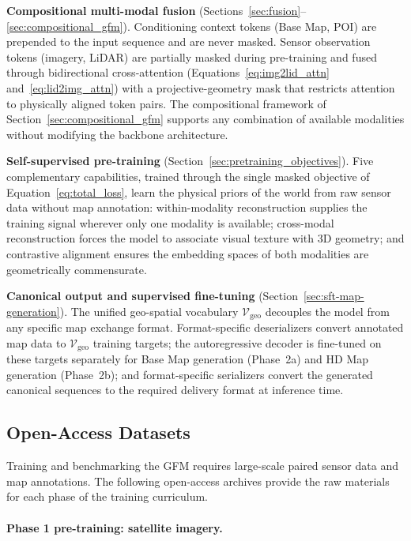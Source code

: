 \documentclass{book}
\begin{document}
\textbf{Compositional multi-modal fusion}
(Sections~\ref{sec:fusion}--\ref{sec:compositional_gfm}).
Conditioning context tokens (Base Map, POI) are prepended
to the input sequence and are never masked.  Sensor
observation tokens (imagery, LiDAR) are partially masked
during pre-training and fused through bidirectional
cross-attention (Equations~\ref{eq:img2lid_attn}
and~\ref{eq:lid2img_attn}) with a projective-geometry mask
that restricts attention to physically aligned token pairs.
The compositional framework of
Section~\ref{sec:compositional_gfm} supports any combination
of available modalities without modifying the backbone
architecture.

\textbf{Self-supervised pre-training}
(Section~\ref{sec:pretraining_objectives}).
Five complementary capabilities, trained through the single
masked objective of Equation~\ref{eq:total_loss}, learn the
physical priors of the world from raw sensor data without map
annotation: within-modality reconstruction supplies the training
signal wherever only one modality is available; cross-modal
reconstruction forces the model to associate visual texture with
3D geometry; and contrastive alignment ensures the embedding
spaces of both modalities are geometrically commensurate.

\textbf{Canonical output and supervised fine-tuning}
(Section~\ref{sec:sft-map-generation}).
The unified geo-spatial vocabulary $\mathcal{V}_{\text{geo}}$
decouples the model from any specific map exchange format.
Format-specific deserializers convert annotated map data to
$\mathcal{V}_{\text{geo}}$ training targets; the autoregressive
decoder is fine-tuned on these targets separately for Base
Map generation (Phase~2a) and HD Map generation (Phase~2b);
and format-specific serializers convert the generated
canonical sequences to the required delivery format at
inference time.

\subsection{Open-Access Datasets}
\label{sec:datasets}

Training and benchmarking the GFM requires large-scale
paired sensor data and map annotations.  The following
open-access archives provide the raw materials for each
phase of the training curriculum.

\paragraph{Phase 1 pre-training: satellite imagery.}
\end{document}
